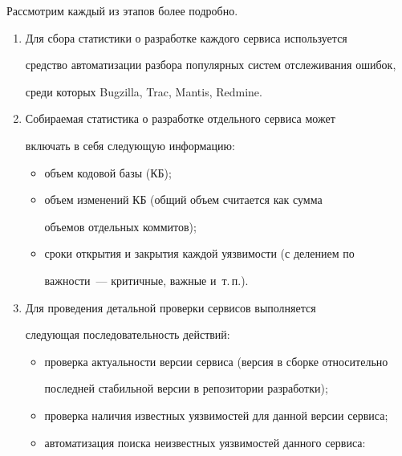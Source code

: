   


  Рассмотрим каждый из этапов более подробно.


  


  \noindent


  \begin{enumerate}[1.]


  \item Для сбора статистики о разработке каждого сервиса используется 


средство автоматизации разбора популярных систем отслеживания ошибок, 


среди которых Bugzilla, Trac, Mantis, Redmine.


  \item Собираемая статистика о разработке отдельного сервиса может 


включать в себя следующую информацию:


  \begin{itemize}


\item объем кодовой базы (КБ);


\item объем изменений КБ (общий объем считается как сумма 


объемов отдельных коммитов);


\item сроки открытия и закрытия каждой уязвимости (с делением по 


важ\-ности~--- критичные, важные и~т.\,п.).


\end{itemize}


  \item Для проведения детальной проверки сервисов выполняется 


следующая последовательность действий:


  \begin{itemize}


\item проверка актуальности версии сервиса (версия в сборке относительно 


последней стабильной версии в репозитории разработки);


\item проверка наличия известных уязвимостей для данной версии сервиса;


\item автоматизация поиска неизвестных уязвимостей данного сервиса:



\end{itemize}
\end{enumerate}
